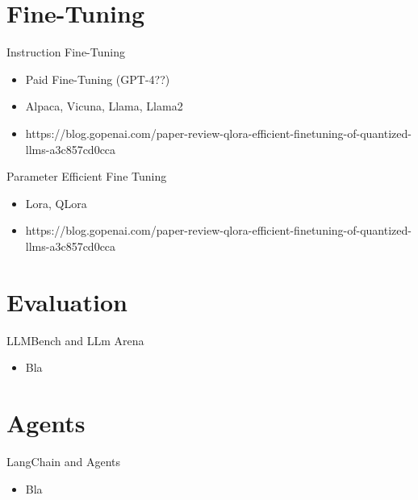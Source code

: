 \documentclass[handout]{beamer}
\begin{document}
\section{Fine-Tuning}

\begin{frame}{Instruction Fine-Tuning}
\begin{scriptsize}
\begin{itemize}
\item Paid Fine-Tuning (GPT-4??)
\item Alpaca, Vicuna, Llama, Llama2
\item https://blog.gopenai.com/paper-review-qlora-efficient-finetuning-of-quantized-llms-a3c857cd0cca
\end{itemize}
\end{scriptsize}
\end{frame}



\begin{frame}{Parameter Efficient Fine Tuning}
\begin{scriptsize}
\begin{itemize}
\item Lora, QLora
\item https://blog.gopenai.com/paper-review-qlora-efficient-finetuning-of-quantized-llms-a3c857cd0cca
\end{itemize}
\end{scriptsize}
\end{frame}



\section{Evaluation}
\begin{frame}{LLMBench and LLm Arena}
\begin{scriptsize}
\begin{itemize}
\item Bla
\end{itemize}
\end{scriptsize}
\end{frame}



\section{Agents}

\begin{frame}{LangChain and Agents}
\begin{scriptsize}
\begin{itemize}
\item Bla
\end{itemize}
\end{scriptsize}
\end{frame}
\end{document}
